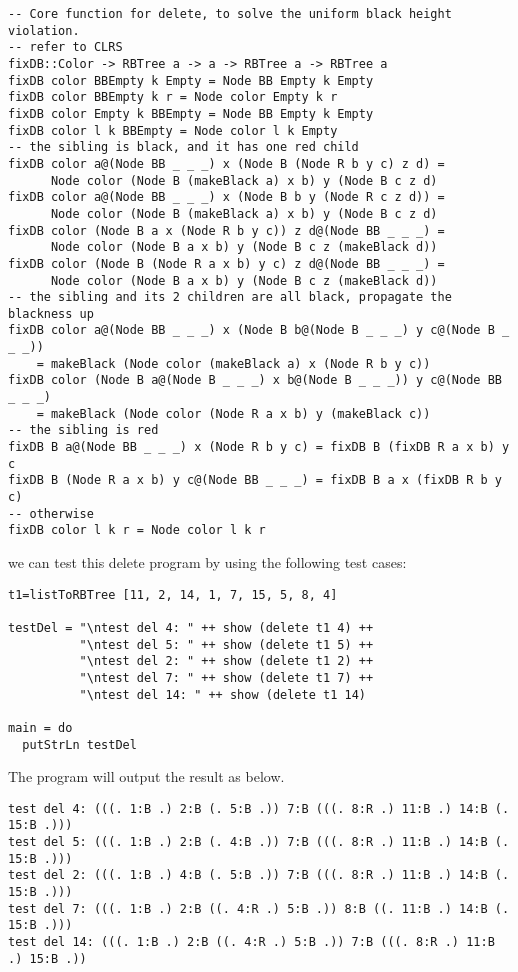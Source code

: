 \documentclass{article}
\begin{document}
\begin{lstlisting}
-- Core function for delete, to solve the uniform black height violation.
-- refer to CLRS
fixDB::Color -> RBTree a -> a -> RBTree a -> RBTree a
fixDB color BBEmpty k Empty = Node BB Empty k Empty
fixDB color BBEmpty k r = Node color Empty k r
fixDB color Empty k BBEmpty = Node BB Empty k Empty
fixDB color l k BBEmpty = Node color l k Empty
-- the sibling is black, and it has one red child
fixDB color a@(Node BB _ _ _) x (Node B (Node R b y c) z d) = 
      Node color (Node B (makeBlack a) x b) y (Node B c z d)
fixDB color a@(Node BB _ _ _) x (Node B b y (Node R c z d)) = 
      Node color (Node B (makeBlack a) x b) y (Node B c z d)
fixDB color (Node B a x (Node R b y c)) z d@(Node BB _ _ _) = 
      Node color (Node B a x b) y (Node B c z (makeBlack d))
fixDB color (Node B (Node R a x b) y c) z d@(Node BB _ _ _) = 
      Node color (Node B a x b) y (Node B c z (makeBlack d))
-- the sibling and its 2 children are all black, propagate the blackness up
fixDB color a@(Node BB _ _ _) x (Node B b@(Node B _ _ _) y c@(Node B _ _ _))
    = makeBlack (Node color (makeBlack a) x (Node R b y c))
fixDB color (Node B a@(Node B _ _ _) x b@(Node B _ _ _)) y c@(Node BB _ _ _)
    = makeBlack (Node color (Node R a x b) y (makeBlack c))
-- the sibling is red
fixDB B a@(Node BB _ _ _) x (Node R b y c) = fixDB B (fixDB R a x b) y c
fixDB B (Node R a x b) y c@(Node BB _ _ _) = fixDB B a x (fixDB R b y c)
-- otherwise
fixDB color l k r = Node color l k r
\end{lstlisting}


we can test this delete program by using the following test cases:

\begin{lstlisting}
t1=listToRBTree [11, 2, 14, 1, 7, 15, 5, 8, 4]

testDel = "\ntest del 4: " ++ show (delete t1 4) ++
          "\ntest del 5: " ++ show (delete t1 5) ++
          "\ntest del 2: " ++ show (delete t1 2) ++
          "\ntest del 7: " ++ show (delete t1 7) ++
          "\ntest del 14: " ++ show (delete t1 14)

main = do
  putStrLn testDel
\end{lstlisting}

The program will output the result as below.

\begin{verbatim}
test del 4: (((. 1:B .) 2:B (. 5:B .)) 7:B (((. 8:R .) 11:B .) 14:B (. 15:B .)))
test del 5: (((. 1:B .) 2:B (. 4:B .)) 7:B (((. 8:R .) 11:B .) 14:B (. 15:B .)))
test del 2: (((. 1:B .) 4:B (. 5:B .)) 7:B (((. 8:R .) 11:B .) 14:B (. 15:B .)))
test del 7: (((. 1:B .) 2:B ((. 4:R .) 5:B .)) 8:B ((. 11:B .) 14:B (. 15:B .)))
test del 14: (((. 1:B .) 2:B ((. 4:R .) 5:B .)) 7:B (((. 8:R .) 11:B .) 15:B .))
\end{verbatim}
\end{document}
